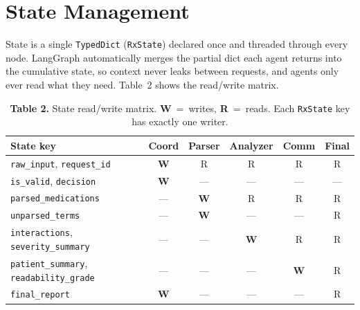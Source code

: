 \documentclass[11pt]{article}
\begin{document}
\section*{State Management}\label{state}

State is a single \texttt{TypedDict} (\texttt{RxState}) declared once
and threaded through every node. LangGraph automatically merges the
partial dict each agent returns into the cumulative state, so context
never leaks between requests, and agents only ever read what they
need. Table~2 shows the read/write matrix.

\begin{table}[h]
\centering
\caption*{\small\textbf{Table 2.} State read/write matrix. \textbf{W}~=~writes, \textbf{R}~=~reads. Each \texttt{RxState} key has exactly one writer.}
\renewcommand{\arraystretch}{1.2}
\small
\begin{tabular}{l c c c c c}
\toprule
\textbf{State key}                              & \textbf{Coord} & \textbf{Parser} & \textbf{Analyzer} & \textbf{Comm} & \textbf{Final} \\
\midrule
\texttt{raw\_input}, \texttt{request\_id}              & \cellcolor{rxprimary!20}\textbf{W} & \cellcolor{rxlow!15}R & \cellcolor{rxlow!15}R & \cellcolor{rxlow!15}R & \cellcolor{rxlow!15}R \\
\texttt{is\_valid}, \texttt{decision}                  & \cellcolor{rxprimary!20}\textbf{W} & --- & --- & --- & --- \\
\texttt{parsed\_medications}                           & --- & \cellcolor{rxprimary!20}\textbf{W} & \cellcolor{rxlow!15}R & \cellcolor{rxlow!15}R & \cellcolor{rxlow!15}R \\
\texttt{unparsed\_terms}                               & --- & \cellcolor{rxprimary!20}\textbf{W} & --- & --- & \cellcolor{rxlow!15}R \\
\texttt{interactions}, \texttt{severity\_summary}      & --- & --- & \cellcolor{rxprimary!20}\textbf{W} & \cellcolor{rxlow!15}R & \cellcolor{rxlow!15}R \\
\texttt{patient\_summary}, \texttt{readability\_grade} & --- & --- & --- & \cellcolor{rxprimary!20}\textbf{W} & \cellcolor{rxlow!15}R \\
\texttt{final\_report}                                 & \cellcolor{rxprimary!20}\textbf{W} & --- & --- & --- & \cellcolor{rxlow!15}R \\
\bottomrule
\end{tabular}
\end{table}
\end{document}
